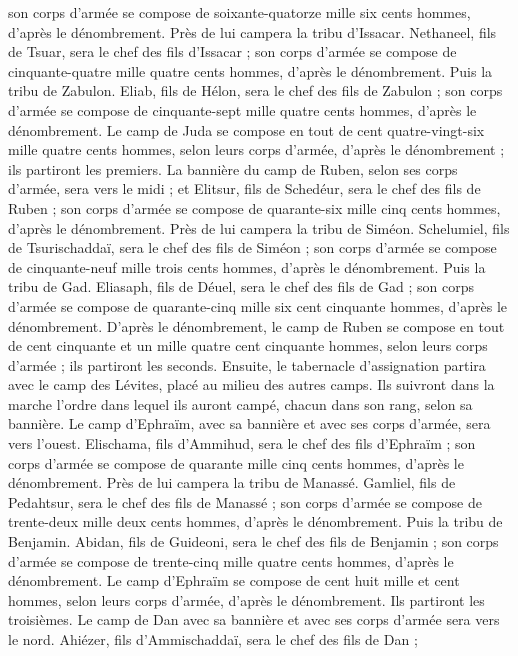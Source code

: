 \begin{multicols}{2}
son corps d’armée se compose de soixante-quatorze mille six cents hommes, d’après le dénombrement.
Près de lui campera la tribu d'Issacar. Nethaneel, fils de Tsuar, sera le chef des fils d'Issacar ;
son corps d’armée se compose de cinquante-quatre mille quatre cents hommes, d’après le dénombrement.
Puis la tribu de Zabulon. Eliab, fils de Hélon, sera le chef des fils de Zabulon ;
son corps d’armée se compose de cinquante-sept mille quatre cents hommes, d’après le dénombrement.
Le camp de Juda se compose en tout de cent quatre-vingt-six mille quatre cents hommes, selon leurs corps d’armée, d’après le dénombrement ; ils partiront les premiers.
La bannière du camp de Ruben, selon ses corps d’armée, sera vers le midi ; et Elitsur, fils de Schedéur, sera le chef des fils de Ruben ;
son corps d’armée se compose de quarante-six mille cinq cents hommes, d’après le dénombrement.
Près de lui campera la tribu de Siméon. Schelumiel, fils de Tsurischaddaï, sera le chef des fils de Siméon ;
son corps d’armée se compose de cinquante-neuf mille trois cents hommes, d’après le dénombrement.
Puis la tribu de Gad. Eliasaph, fils de Déuel, sera le chef des fils de Gad ;
son corps d’armée se compose de quarante-cinq mille six cent cinquante hommes, d’après le dénombrement.
D’après le dénombrement, le camp de Ruben se compose en tout de cent cinquante et un mille quatre cent cinquante hommes, selon leurs corps d’armée ; ils partiront les seconds.
Ensuite, le tabernacle d'assignation partira avec le camp des Lévites, placé au milieu des autres camps. Ils suivront dans la marche l’ordre dans lequel ils auront campé, chacun dans son rang, selon sa bannière.
Le camp d'Ephraïm, avec sa bannière et avec ses corps d’armée, sera vers l'ouest. Elischama, fils d’Ammihud, sera le chef des fils d'Ephraïm ;
son corps d’armée se compose de quarante mille cinq cents hommes, d’après le dénombrement.
Près de lui campera la tribu de Manassé. Gamliel, fils de Pedahtsur, sera le chef des fils de Manassé ;
son corps d’armée se compose de trente-deux mille deux cents hommes, d’après le dénombrement.
Puis la tribu de Benjamin. Abidan, fils de Guideoni, sera le chef des fils de Benjamin ;
son corps d’armée se compose de trente-cinq mille quatre cents hommes, d’après le dénombrement.
Le camp d'Ephraïm se compose de cent huit mille et cent hommes, selon leurs corps d’armée, d’après le dénombrement. Ils partiront les troisièmes.
Le camp de Dan avec sa bannière et avec ses corps d’armée sera vers le nord. Ahiézer, fils d’Ammischaddaï, sera le chef des fils de Dan ;

\end{multicols}
